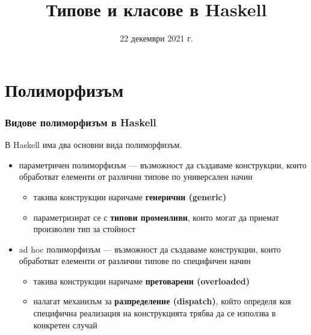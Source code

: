\documentclass[alsotrans]{beamerswitch}
\title{Типове и класове в Haskell}
\date{22 декември 2021 г.}
\begin{document}
\begin{frame}
  \titlepage
\end{frame}

\section{Полиморфизъм}

\begin{frame}
  \frametitle{Видове полиморфизъм в Haskell}

  В Haskell има два основни вида полиморфизъм.
  \begin{itemize}[<+->]
  \item \alert{параметричен полиморфизъм} --- възможност да създаваме конструкции, които обработват елементи от различни типове по \alert{универсален} начин
    \begin{itemize}
    \item такива конструкции наричаме \textbf{генерични (generic)}
    \item параметризират се  с \textbf{типови променливи}, които могат да приемат произволен тип за стойност
    \end{itemize}
  \item \alert{ad hoc полиморфизъм} --- възможност да създаваме конструкции, които обработват елементи от различни типове по \alert{специфичен} начин
    \begin{itemize}
    \item такива конструкции наричаме \textbf{претоварени (overloaded)}
    \item налагат механизъм за \textbf{разпределение (dispatch)}, който определя коя специфична реализация на конструкцията трябва да се използва в конкретен случай
    \end{itemize}
  \end{itemize}
\end{frame}
\end{document}
